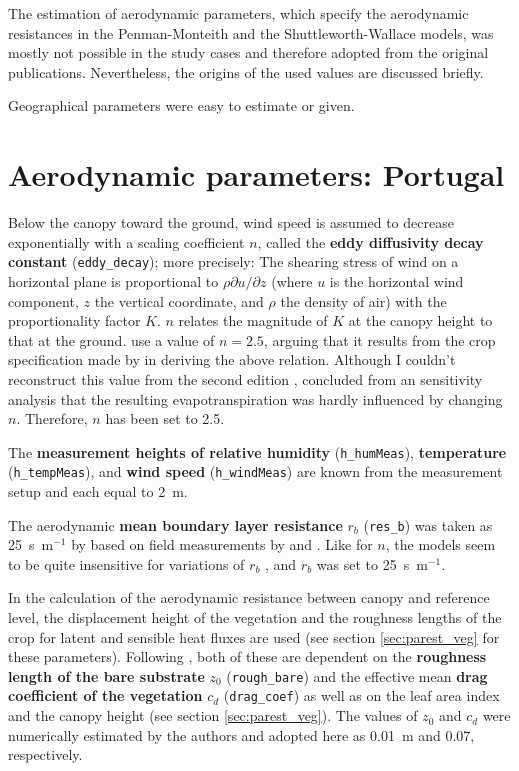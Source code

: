 \documentclass{scrreprt}
\begin{document}
The estimation of aerodynamic parameters, which specify the aerodynamic resistances in the Penman-Monteith and the Shuttleworth-Wallace models, was mostly not possible in the study cases and therefore adopted from the original publications.
Nevertheless, the origins of the used values are discussed briefly.

Geographical parameters were easy to estimate or given.



\section{Aerodynamic parameters: Portugal} \label{sec:parest_met}

Below the canopy toward the ground, wind speed is assumed to decrease exponentially with a scaling coefficient $n$, called the \textbf{eddy diffusivity decay constant} (\verb!eddy_decay!); more precisely:
The shearing stress of wind on a horizontal plane is proportional to $\rho \partial u / \partial z$ (where $u$ is the horizontal wind component, $z$ the vertical coordinate, and $\rho$ the density of air) with the proportionality factor $K$.
$n$ relates the magnitude of $K$ at the canopy height to that at the ground.
\citet{shuttleworth85} use a value of $n = 2.5$, arguing that it results from the crop specification made by \citet{monteith73} in deriving the above relation.
Although I couldn't reconstruct this value from the second edition \citep{monteith90}, \citet{shuttleworth85} concluded from an sensitivity analysis that the resulting evapotranspiration was hardly influenced by changing $n$.
Therefore, $n$ has been set to 2.5.

The \textbf{measurement heights of relative humidity} (\verb!h_humMeas!), \textbf{temperature} (\verb!h_tempMeas!), and \textbf{wind speed} (\verb!h_windMeas!) are known from the measurement setup and each equal to 2~m.

The aerodynamic \textbf{mean boundary layer resistance} $r_b$ (\verb!res_b!) was taken as 25~s~m$^{-1}$ by \citet{shuttleworth85} based on field measurements by \citet{denmead76} and \citet{uchijima76}.
Like for $n$, the models seem to be quite insensitive for variations of $r_b$ \citep{shuttleworth85}, and $r_b$ was set to 25~s~m$^{-1}$.

In the calculation of the aerodynamic resistance between canopy and reference level, the displacement height of the vegetation and the roughness lengths of the crop for latent and sensible heat fluxes are used (see section \ref{sec:parest_veg} for these parameters).
Following \citet{shuttleworth90}, both of these are dependent on the \textbf{roughness length of the bare substrate} $z_0$ (\verb!rough_bare!) and the effective mean \textbf{drag coefficient of the vegetation} $c_d$ (\verb!drag_coef!) as well as on the leaf area index and the canopy height (see section \ref{sec:parest_veg}).
The values of $z_0$ and $c_d$ were numerically estimated by the authors and adopted here as 0.01~m and 0.07, respectively.
\end{document}
